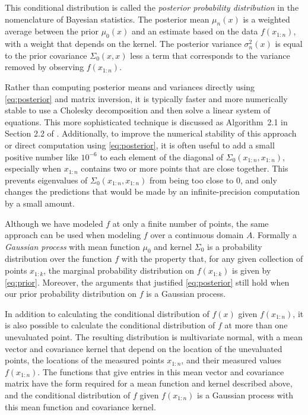 \documentclass{article}
\begin{document}
	This conditional distribution is called the {\it posterior probability distribution} in the nomenclature of Bayesian statistics.  
The posterior mean $\mu_n(x)$ is a weighted average between the prior $\mu_0(x)$ and an estimate based on the data $f(x_{1:n})$, with a weight that depends on the kernel.
The posterior variance $\sigma_n^2(x)$ is equal to the prior covariance $\Sigma_0(x,x)$ less a term that corresponds to the variance removed by observing $f(x_{1:n})$.

Rather than computing posterior means and variances directly using \eqref{eq:posterior} and matrix inversion, it is typically faster and more numerically stable to use a Cholesky decomposition and then solve a linear system of equations.  This more sophisticated technique is discussed as Algorithm~2.1 in Section 2.2 of \cite{RaWi06}.  Additionally, to improve the numerical stability of this approach or direct computation using \eqref{eq:posterior}, it is often useful to add a small positive number like $10^{-6}$ to each element of the diagonal of $\Sigma_0(x_{1:n},x_{1:n})$, especially when $x_{1:n}$ contains two or more points that are close together.  
This prevents eigenvalues of $\Sigma_0(x_{1:n},x_{1:n})$ from being too close to $0$, and only changes the predictions that would be made by an infinite-precision computation by a small amount.

Although we have modeled $f$ at only a finite number of points, the same approach can be used when modeling $f$ over a continuous domain $A$.  Formally a {\it Gaussian process} with mean function $\mu_0$ and kernel $\Sigma_0$ is a probability distribution over the function $f$ with the property that, for any given collection of points $x_{1:k}$, the marginal probability distribution on $f(x_{1:k})$ is given by \eqref{eq:prior}.  Moreover, the arguments that justified \eqref{eq:posterior} still hold when our prior probability distribution on $f$ is a Gaussian process. 

In addition to calculating the conditional distribution of $f(x)$ given $f(x_{1:n})$, it is also possible to calculate the conditional distribution of $f$ at more than one unevaluated point.  The resulting distribution is multivariate normal, with a mean vector and covariance kernel that depend on the location of the unevaluated points, the locations of the measured points $x_{1:n}$, and their measured values $f(x_{1:n})$.  The functions that give entries in this mean vector and covariance matrix have the form required for a mean function and kernel described above, 
and the conditional distribution of $f$ given $f(x_{1:n})$ is a Gaussian process with this mean function and covariance kernel.
\end{document}
